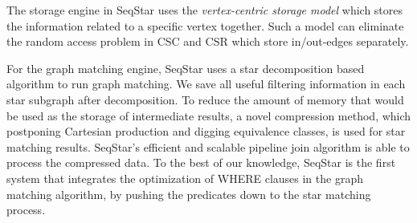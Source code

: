 The storage engine in SeqStar uses the \emph{vertex-centric storage model} which stores the information related to a specific vertex together. Such a model can eliminate the random access problem in CSC and CSR which store in/out-edges separately. %

For the graph matching engine, SeqStar uses a star decomposition based algorithm to run graph matching. %
We save all useful filtering information in each star subgraph after decomposition. To reduce the amount of memory that would be used as the storage of intermediate results, a novel compression method, which postponing Cartesian production and digging equivalence classes, is used for star matching results. SeqStar's efficient and scalable pipeline join algorithm is able to process the compressed data. To the best of our knowledge, SeqStar is the first system that integrates the optimization of WHERE clauses in the graph matching algorithm, by pushing the predicates down to the star matching process.



